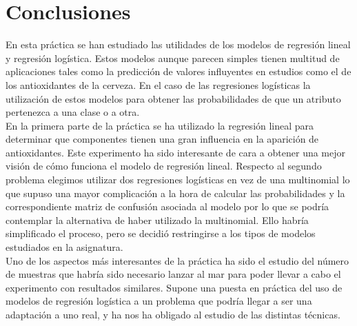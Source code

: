 \documentclass{article}
\begin{document}
\newpage
\section{Conclusiones}

En esta práctica se han estudiado las utilidades de los modelos de regresión lineal y regresión logística. Estos modelos aunque parecen simples tienen multitud de aplicaciones tales como la predicción de valores influyentes en estudios como el de los antioxidantes de la cerveza. En el caso de las regresiones logísticas la utilización de estos modelos para obtener las probabilidades de que un atributo pertenezca a una clase o a otra.\\

En la primera parte de la práctica se ha utilizado la regresión lineal para determinar que componentes tienen una gran influencia en la aparición de antioxidantes. Este experimento ha sido interesante de cara a obtener una mejor visión de cómo funciona el modelo de regresión lineal.
Respecto al segundo problema elegimos utilizar dos regresiones logísticas en vez de una multinomial lo que supuso una mayor complicación a la hora de calcular las probabilidades y la correspondiente matriz de confusión asociada al modelo por lo que se podría contemplar la alternativa de haber utilizado la multinomial. Ello habría simplificado el proceso, pero se decidió restringirse a los tipos de modelos estudiados en la asignatura. \\

Uno de los aspectos más interesantes de la práctica ha sido el estudio del número de muestras que habría sido necesario lanzar al mar para poder llevar a cabo el experimento con resultados similares. Supone una puesta en práctica del uso de modelos de regresión logística a un problema que podría llegar a ser una adaptación a uno real, y ha nos ha obligado al estudio de las distintas técnicas.

\end{document}
